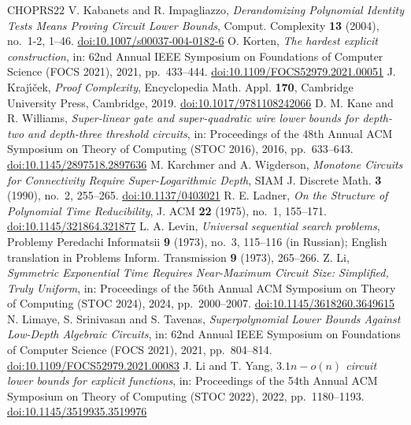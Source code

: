 \begin{thebibliography}{CHOPRS22}
 V. Kabanets and R. Impagliazzo, \emph{Derandomizing Polynomial Identity Tests Means Proving Circuit Lower Bounds}, Comput. Complexity \textbf{13} (2004), no.~1-2, 1--46. \href{https://doi.org/10.1007/s00037-004-0182-6}{doi:10.1007/s00037-004-0182-6}
 O. Korten, \emph{The hardest explicit construction}, in: 62nd Annual IEEE Symposium on Foundations of Computer Science (FOCS 2021), 2021, pp.~433--444. \href{https://doi.org/10.1109/FOCS52979.2021.00051}{doi:10.1109/FOCS52979.2021.00051}
 J. Kraj{\'\i}{\v c}ek, \emph{Proof Complexity}, Encyclopedia Math. Appl. \textbf{170}, Cambridge University Press, Cambridge, 2019. \href{https://doi.org/10.1017/9781108242066}{doi:10.1017/9781108242066}
 D. M. Kane and R. Williams, \emph{Super-linear gate and super-quadratic wire lower bounds for depth-two and depth-three threshold circuits}, in: Proceedings of the 48th Annual ACM Symposium on Theory of Computing (STOC 2016), 2016, pp.~633--643. \href{https://doi.org/10.1145/2897518.2897636}{doi:10.1145/2897518.2897636}
 M. Karchmer and A. Wigderson, \emph{Monotone Circuits for Connectivity Require Super-Logarithmic Depth}, SIAM J. Discrete Math. \textbf{3} (1990), no.~2, 255--265. \href{https://doi.org/10.1137/0403021}{doi:10.1137/0403021}
 R. E. Ladner, \emph{On the Structure of Polynomial Time Reducibility}, J. ACM \textbf{22} (1975), no.~1, 155--171. \href{https://doi.org/10.1145/321864.321877}{doi:10.1145/321864.321877}
 L. A. Levin, \emph{Universal sequential search problems}, Problemy Peredachi Informatsii \textbf{9} (1973), no.~3, 115--116 (in Russian); English translation in Problems Inform. Transmission \textbf{9} (1973), 265--266.
 Z. Li, \emph{Symmetric Exponential Time Requires Near-Maximum Circuit Size: Simplified, Truly Uniform}, in: Proceedings of the 56th Annual ACM Symposium on Theory of Computing (STOC 2024), 2024, pp.~2000--2007. \href{https://doi.org/10.1145/3618260.3649615}{doi:10.1145/3618260.3649615}
 N. Limaye, S. Srinivasan and S. Tavenas, \emph{Superpolynomial Lower Bounds Against Low-Depth Algebraic Circuits}, in: 62nd Annual IEEE Symposium on Foundations of Computer Science (FOCS 2021), 2021, pp.~804--814. \href{https://doi.org/10.1109/FOCS52979.2021.00083}{doi:10.1109/FOCS52979.2021.00083}
 J. Li and T. Yang, \emph{$3.1n-o(n)$ circuit lower bounds for explicit functions}, in: Proceedings of the 54th Annual ACM Symposium on Theory of Computing (STOC 2022), 2022, pp.~1180--1193. \href{https://doi.org/10.1145/3519935.3519976}{doi:10.1145/3519935.3519976}

\end{thebibliography}
